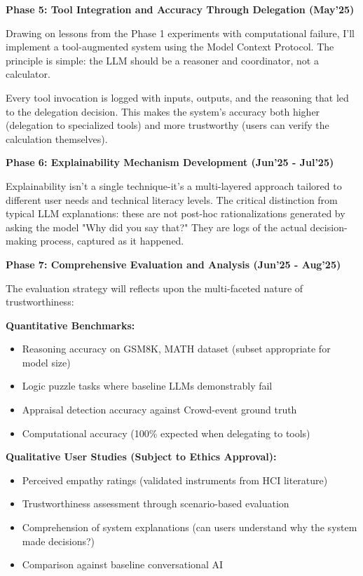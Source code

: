 \documentclass[a4paper,oneside,12pt]{book}
\numberwithin{equation}{chapter} %
\begin{document}
\textbf{Phase 5: Tool Integration and Accuracy Through Delegation (May'25)}

Drawing on lessons from the Phase 1 experiments with computational failure, I'll implement a tool-augmented system using the Model Context Protocol. The principle is simple: the LLM should be a reasoner and coordinator, not a calculator.

Every tool invocation is logged with inputs, outputs, and the reasoning that led to the delegation decision. This makes the system's accuracy both higher (delegation to specialized tools) and more trustworthy (users can verify the calculation themselves).

\textbf{Phase 6: Explainability Mechanism Development (Jun'25 - Jul'25)}

Explainability isn't a single technique-it's a multi-layered approach tailored to different user needs and technical literacy levels. The critical distinction from typical LLM explanations: these are not post-hoc rationalizations generated by asking the model "Why did you say that?" They are logs of the actual decision-making process, captured as it happened.

\textbf{Phase 7: Comprehensive Evaluation and Analysis (Jun'25 - Aug'25)}

The evaluation strategy will reflects upon the multi-faceted nature of trustworthiness:

\textbf{Quantitative Benchmarks:}
\begin{itemize}
\item Reasoning accuracy on GSM8K, MATH dataset (subset appropriate for model size)
\item Logic puzzle tasks where baseline LLMs demonstrably fail
\item Appraisal detection accuracy against Crowd-event ground truth
\item Computational accuracy (100\% expected when delegating to tools)
\end{itemize}

\textbf{Qualitative User Studies (Subject to Ethics Approval):}
\begin{itemize}
\item Perceived empathy ratings (validated instruments from HCI literature)
\item Trustworthiness assessment through scenario-based evaluation
\item Comprehension of system explanations (can users understand why the system made decisions?)
\item Comparison against baseline conversational AI
\end{itemize}
\end{document}
